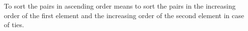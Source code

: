 To sort the pairs in ascending order means to sort the pairs in the increasing order of the first element and the increasing order of the second element in case of ties.
